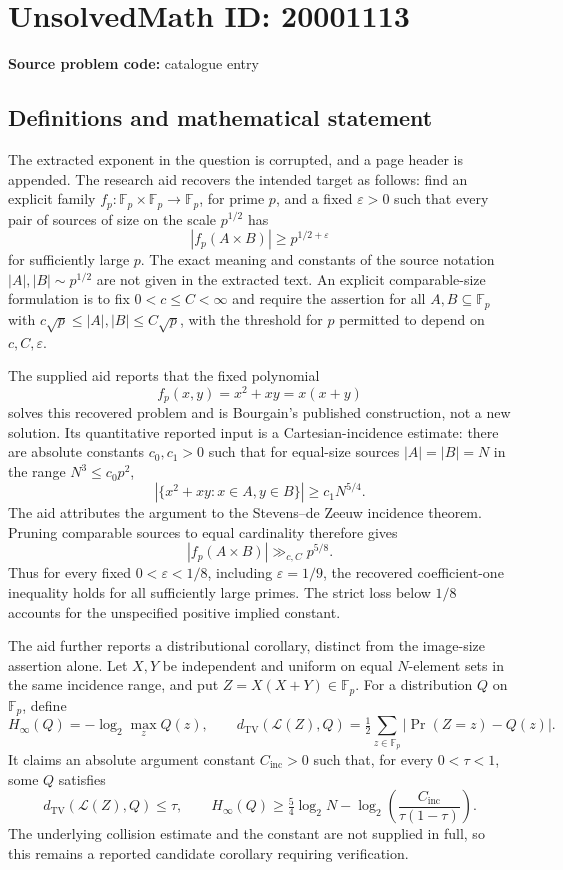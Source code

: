 \documentclass[11pt]{article}
\newcommand{\F}{\mathbb{F}}
\begin{document}
\section*{UnsolvedMath ID: 20001113}
\textbf{Source problem code:} catalogue entry
\subsection{Definitions and mathematical statement}
The extracted exponent in the question is corrupted, and a page header is appended. The research aid recovers the intended target as follows: find an explicit family \(f_p:\F_p\times\F_p\to\F_p\), for prime \(p\), and a fixed \(\varepsilon>0\) such that every pair of sources of size on the scale \(p^{1/2}\) has
\[
 |f_p(A\times B)|\geq p^{1/2+\varepsilon}
\]
for sufficiently large \(p\). The exact meaning and constants of the source notation \(|A|,|B|\sim p^{1/2}\) are not given in the extracted text. An explicit comparable-size formulation is to fix \(0<c\leq C<\infty\) and require the assertion for all \(A,B\subseteq\F_p\) with \(c\sqrt p\leq|A|,|B|\leq C\sqrt p\), with the threshold for \(p\) permitted to depend on \(c,C,\varepsilon\).

The supplied aid reports that the fixed polynomial
\[
 f_p(x,y)=x^2+xy=x(x+y)
\]
solves this recovered problem and is Bourgain's published construction, not a new solution. Its quantitative reported input is a Cartesian-incidence estimate: there are absolute constants \(c_0,c_1>0\) such that for equal-size sources \(|A|=|B|=N\) in the range \(N^3\leq c_0p^2\),
\[
 |\{x^2+xy:x\in A,y\in B\}|\geq c_1N^{5/4}.
\]
The aid attributes the argument to the Stevens--de Zeeuw incidence theorem. Pruning comparable sources to equal cardinality therefore gives
\[
 |f_p(A\times B)|\gg_{c,C}p^{5/8}.
\]
Thus for every fixed \(0<\varepsilon<1/8\), including \(\varepsilon=1/9\), the recovered coefficient-one inequality holds for all sufficiently large primes. The strict loss below \(1/8\) accounts for the unspecified positive implied constant.

The aid further reports a distributional corollary, distinct from the image-size assertion alone. Let \(X,Y\) be independent and uniform on equal \(N\)-element sets in the same incidence range, and put \(Z=X(X+Y)\in\F_p\). For a distribution \(Q\) on \(\F_p\), define
\[
 H_\infty(Q)=-\log_2\max_zQ(z),\qquad
 d_{\mathrm{TV}}(\mathcal L(Z),Q)=\tfrac12\sum_{z\in\F_p}|\Pr(Z=z)-Q(z)|.
\]
It claims an absolute argument constant \(C_{\mathrm{inc}}>0\) such that, for every \(0<\tau<1\), some \(Q\) satisfies
\[
 d_{\mathrm{TV}}(\mathcal L(Z),Q)\leq\tau,\qquad
 H_\infty(Q)\geq\tfrac54\log_2N-
 \log_2\!\left(\frac{C_{\mathrm{inc}}}{\tau(1-\tau)}\right).
\]
The underlying collision estimate and the constant are not supplied in full, so this remains a reported candidate corollary requiring verification.
\end{document}
